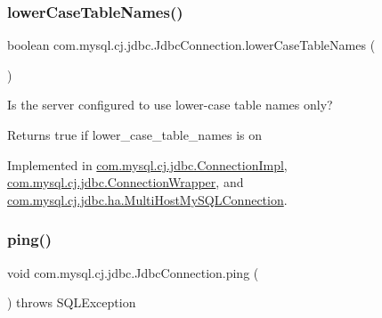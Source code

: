 \mbox{\label{interfacecom_1_1mysql_1_1cj_1_1jdbc_1_1_jdbc_connection_a54cca6407a1a531b8e65ee3d965a51cd}} 
\subsubsection{\texorpdfstring{lower\+Case\+Table\+Names()}{lowerCaseTableNames()}}
{\footnotesize\ttfamily boolean com.\+mysql.\+cj.\+jdbc.\+Jdbc\+Connection.\+lower\+Case\+Table\+Names (\begin{DoxyParamCaption}{ }\end{DoxyParamCaption})}

Is the server configured to use lower-\/case table names only?

\begin{DoxyReturn}{Returns}
true if lower\+\_\+case\+\_\+table\+\_\+names is \textquotesingle{}on\textquotesingle{} 
\end{DoxyReturn}


Implemented in \mbox{\hyperlink{classcom_1_1mysql_1_1cj_1_1jdbc_1_1_connection_impl_a75475406eba7048aeb899c27d04f2c59}{com.\+mysql.\+cj.\+jdbc.\+Connection\+Impl}}, \mbox{\hyperlink{classcom_1_1mysql_1_1cj_1_1jdbc_1_1_connection_wrapper_aba2642633d16efa8be0fd109c0fa9747}{com.\+mysql.\+cj.\+jdbc.\+Connection\+Wrapper}}, and \mbox{\hyperlink{classcom_1_1mysql_1_1cj_1_1jdbc_1_1ha_1_1_multi_host_my_s_q_l_connection_a5a3250cfcbd628ed09ce0eb494a1ff20}{com.\+mysql.\+cj.\+jdbc.\+ha.\+Multi\+Host\+My\+S\+Q\+L\+Connection}}.

\mbox{\label{interfacecom_1_1mysql_1_1cj_1_1jdbc_1_1_jdbc_connection_a6d078258f83ddc438d64bafb0f665004}} 
\subsubsection{\texorpdfstring{ping()}{ping()}}
{\footnotesize\ttfamily void com.\+mysql.\+cj.\+jdbc.\+Jdbc\+Connection.\+ping (\begin{DoxyParamCaption}{ }\end{DoxyParamCaption}) throws S\+Q\+L\+Exception}

